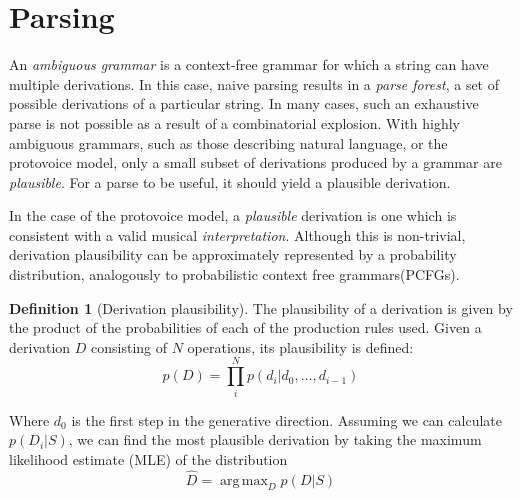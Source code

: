 \documentclass[12pt,a4paper,twoside,openright]{report}
\DeclareMathOperator*{\argmax}{arg\,max}
\theoremstyle{definition}
\newtheorem{definition}{Definition}[section]
\begin{document}
\section{Parsing} %
\label{sub:protovoiceParsing}
An \textit{ambiguous grammar} is a context-free grammar for which a string can have multiple derivations. In this case, naive parsing results in a \textit{parse forest}, a set of possible derivations of a particular string. In many cases, such an exhaustive parse is not possible as a result of a combinatorial explosion. With highly ambiguous grammars, such as those describing natural language, or the protovoice model, only a small subset of derivations produced by a grammar are \textit{plausible}. For a parse to be useful, it should yield a plausible derivation.

In the case of the protovoice model, a \textit{plausible} derivation is one which is consistent with a valid musical \textit{interpretation}. Although this is non-trivial, derivation plausibility can be approximately represented by a probability distribution, analogously to probabilistic context free grammars(PCFGs). 
\par
\par
\begin{definition}[Derivation plausibility]
  The plausibility of a derivation is given by the product of the probabilities of each of the production rules used. Given a derivation $D$ consisting of $N$ operations, its plausibility is defined:
  \begin{equation}
    p(D) = \prod_{i}^N p(d_i| d_0, \dots , d_{i-1})
  \end{equation}
\end{definition}

Where $d_0$ is the first step in the generative direction.
Assuming we can calculate $p(D_i|S)$, we can find the most plausible derivation by taking the maximum likelihood estimate (MLE) of the distribution
\begin{equation}
  \hat D = \argmax_{D}  p(D|S)
  \label{eq:mapApproach}
\end{equation}
\end{document}

